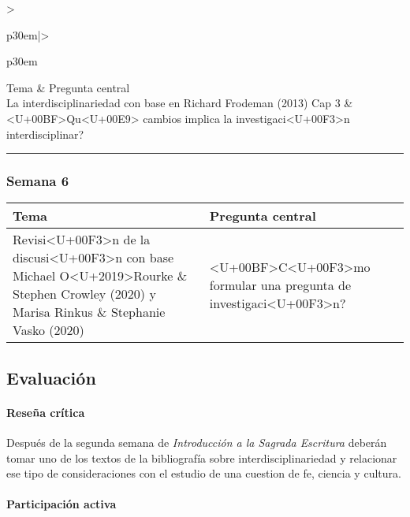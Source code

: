 \documentclass[spanish,]{article}
\let\oldparagraph\paragraph
\renewcommand{\paragraph}[1]{\oldparagraph{#1}\mbox{}}
\begin{document}
\begin{tabular}{>{\raggedright\arraybackslash}p{30em}|>{\raggedright\arraybackslash}p{30em}}
\hline
Tema & Pregunta central\\
\hline
La interdisciplinariedad con base en Richard Frodeman (2013) Cap 3 & <U+00BF>Qu<U+00E9> cambios implica la investigaci<U+00F3>n interdisciplinar?\\
\hline
\end{tabular}

\begin{center}\rule{0.5\linewidth}{\linethickness}\end{center}

\subsubsection{Semana 6}\label{semana-6}

\begin{tabular}{>{\raggedright\arraybackslash}p{30em}|>{\raggedright\arraybackslash}p{30em}}
\hline
Tema & Pregunta central\\
\hline
Revisi<U+00F3>n de la discusi<U+00F3>n con base Michael O<U+2019>Rourke \& Stephen Crowley (2020) y Marisa Rinkus \& Stephanie Vasko (2020) & <U+00BF>C<U+00F3>mo formular una pregunta de investigaci<U+00F3>n?\\
\hline
\end{tabular}

\subsection{Evaluación}\label{evaluaciuxf3n}

\paragraph{\texorpdfstring{\textbf{Reseña
crítica}}{Reseña crítica}}\label{reseuxf1a-cruxedtica}

Después de la segunda semana de \emph{Introducción a la Sagrada
Escritura} deberán tomar uno de los textos de la bibliografía sobre
interdisciplinariedad y relacionar ese tipo de consideraciones con el
estudio de una cuestion de fe, ciencia y cultura.

\paragraph{\texorpdfstring{\textbf{Participación
activa}}{Participación activa}}\label{participaciuxf3n-activa}
\end{document}
